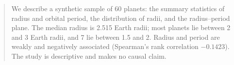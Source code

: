 \begin{abstract}
We describe a synthetic sample of 60 planets: the summary statistics of radius and orbital period, the distribution of radii, and the radius--period plane. The median radius is 2.515 Earth radii; most planets lie between 2 and 3 Earth radii, and 7 lie between 1.5 and 2. Radius and period are weakly and negatively associated (Spearman's rank correlation $-0.1423$). The study is descriptive and makes no causal claim.
\end{abstract}
